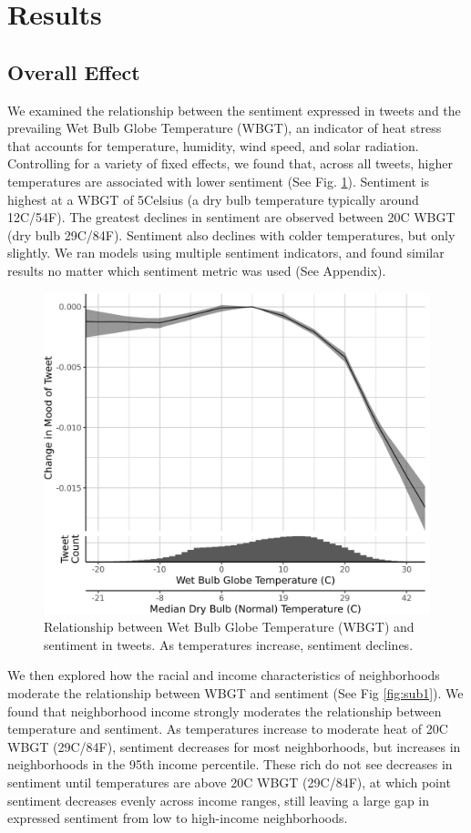 \documentclass{article}
\begin{document}
\section{Results}

\subsection{Overall Effect}
We examined the relationship between the sentiment expressed in tweets and the prevailing Wet Bulb Globe Temperature (WBGT), an indicator of heat stress that accounts for temperature, humidity, wind speed, and solar radiation.  Controlling for a variety of fixed effects, we found that, across all tweets, higher temperatures are associated with lower sentiment (See Fig. \ref{fig:wbgt}).  Sentiment is highest at a WBGT of 5\textdegree Celsius (a dry bulb temperature typically around 12\textdegree C/54\textdegree F).  The greatest declines in sentiment are observed between 20\textdegree C WBGT (dry bulb 29\textdegree C/84\textdegree F).  Sentiment also declines with colder temperatures, but only slightly.  We ran models using multiple sentiment indicators, and found similar results no matter which sentiment metric was used (See Appendix).

\begin{figure}[H]
  \centering
  \includegraphics[width=0.5\linewidth]{../res/wbgt.png}
  \caption{Relationship between Wet Bulb Globe Temperature (WBGT) and sentiment in tweets.  As temperatures increase, sentiment declines.}
  \label{fig:wbgt}
\end{figure}

We then explored how the racial and income characteristics of neighborhoods moderate the relationship between WBGT and sentiment (See Fig \ref{fig:sub1}).  We found that neighborhood income strongly moderates the relationship between temperature and sentiment.  As temperatures increase to moderate heat of 20\textdegree C WBGT (29\textdegree C/84\textdegree F), sentiment decreases for most neighborhoods, but increases in neighborhoods in the 95th income percentile.  These rich do not see decreases in sentiment until temperatures are above 20\textdegree C WBGT (29\textdegree C/84\textdegree F), at which point sentiment decreases evenly across income ranges, still leaving a large gap in expressed sentiment from low to high-income neighborhoods.
\end{document}
